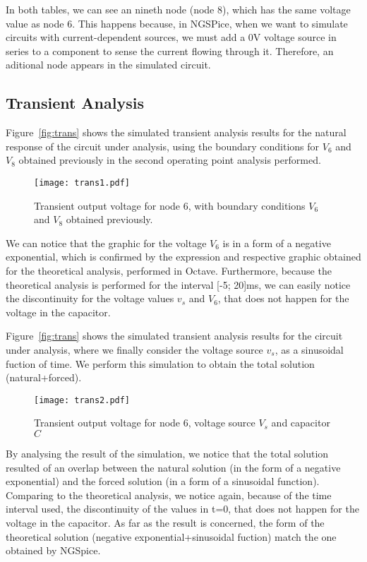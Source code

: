 In both tables, we can see an nineth node (node 8), which has the same voltage value as node 6. This happens because, in NGSPice, when we want to simulate circuits with current-dependent sources, we must add a 0V voltage source in series to a component to sense the current flowing through it. Therefore, an aditional node appears in the simulated circuit.


\subsection{Transient Analysis}


Figure~\ref{fig:trans} shows the simulated transient analysis results for the natural response of 
the circuit under analysis, using the boundary conditions for $V_6$ and $V_8$ obtained previously
in the second operating point analysis performed. 

\begin{figure}[H] \centering
\texttt{[image: trans1.pdf]}
\caption{Transient output voltage for node 6, with boundary conditions $V_6$ and $V_8$ obtained previously.}
\label{fig:trans1}
\end{figure}

We can notice that the graphic for the voltage $V_6$ is in a form of a negative exponential, 
which is confirmed by the expression and respective graphic obtained for the theoretical 
analysis, performed in Octave. Furthermore, because the theoretical analysis is performed
for the interval [-5; 20]ms, we can easily notice the discontinuity for the voltage values
$v_s$ and $V_6$, that does not happen for the voltage in the capacitor.


Figure~\ref{fig:trans} shows the simulated transient analysis results for the
circuit under analysis, where we finally consider the voltage source $v_s$,
as a sinusoidal fuction of time. We perform this simulation to obtain the total
solution (natural+forced).

\begin{figure}[H] \centering
\texttt{[image: trans2.pdf]}
\caption{Transient output voltage for node 6, voltage source $V_s$ and capacitor $C$}
\label{fig:trans2}
\end{figure}

By analysing the result of the simulation, we notice that the total solution resulted 
of an overlap between the natural solution (in the form of a negative exponential) and
the forced solution (in a form of a sinusoidal function). Comparing to the theoretical
analysis, we notice again, because of the time interval used, the discontinuity of the 
values in t=0, that does not happen for the voltage in the capacitor. As far as the result
is concerned, the form of the theoretical solution (negative exponential+sinusoidal fuction)
match the one obtained by NGSpice.


